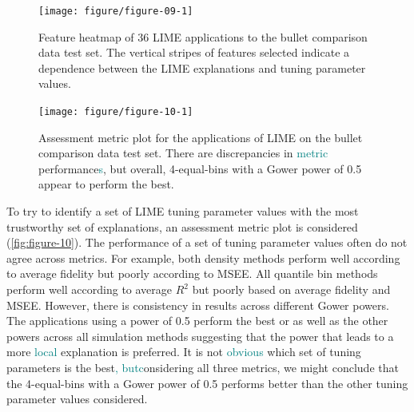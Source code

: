 \documentclass[AMS,STIX2COL]{WileyNJD-v2}\usepackage[]{graphicx}\usepackage[]{color}
\newenvironment{knitrout}{}{} %
\newcommand{\kge}[1]{\textcolor{teal}{#1}}
\renewcommand{\sout}[1]{\unskip}
\begin{document}
\begin{figure}[!thp]
\begin{knitrout}
\color{fgcolor}

{\centering \texttt{[image: figure/figure-09-1]} 

}



\end{knitrout}
\caption{Feature heatmap of 36 LIME applications to the bullet comparison data test set. \sout{In addition to faceting the results by simulation method and LIME feature selection order, facets for the Gower power and whether the observation is a match or non-match are included.} The vertical stripes of features selected indicate a dependence between the LIME explanations and tuning parameter values.}
\label{fig:figure-09}

\vspace*{\floatsep}

\begin{knitrout}
\color{fgcolor}

{\centering \texttt{[image: figure/figure-10-1]} 

}



\end{knitrout}
\caption{Assessment metric plot for the applications of LIME on the bullet comparison data test set. There are discrepancies in \kge{metric} performance\kge{s}\sout{ across metrics for a set of tuning parameter values}, but \sout{based on the} overall\sout{ performance of all \sout{three} metrics}, 4-equal-bins with a Gower power of 0.5 appear\sout{s} to perform the best.}
\label{fig:figure-10}
\end{figure}

To try to identify a set of LIME tuning parameter values with the most trustworthy set of explanations, an assessment metric plot is considered (\autoref{fig:figure-10}). The performance of a set of tuning parameter values often do not agree across metrics. For example, both density methods perform well according to average fidelity but poorly according to MSEE. All quantile bin methods perform well according to average $R^2$ but poorly based on average fidelity and MSEE. However, there is consistency in results across different Gower powers. The applications using a power of 0.5 perform the best or as well as the other powers across all simulation methods suggesting that the power that leads to a more \kge{local} \sout{global} explanation is preferred\sout{ by LIME}. It is not \kge{obvious} \sout{apparent} which set of tuning parameters is the best\kge{, but}\sout{. C}\kge{c}onsidering all three metrics, we might conclude that the 4-equal-bins with a Gower power of 0.5 performs better than the other tuning parameter values considered.
\end{document}

